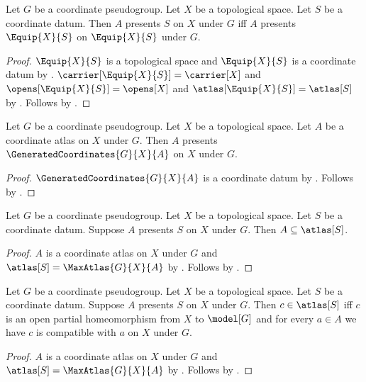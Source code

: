 \begin{theorem}\label{equip_presentation_iff}
    Let $G$ be a coordinate pseudogroup.
    Let $X$ be a topological space.
    Let $S$ be a coordinate datum.
    Then $A$ presents $S$ on $X$ under $G$ iff
        $A$ presents $\Equip{X}{S}$ on $\Equip{X}{S}$ under $G$.
\end{theorem}
\begin{proof}
    $\Equip{X}{S}$ is a topological space and $\Equip{X}{S}$ is a coordinate datum by
        .
    $\carrier[\Equip{X}{S}]=\carrier[X]$ and $\opens[\Equip{X}{S}]=\opens[X]$ and
        $\atlas[\Equip{X}{S}]=\atlas[S]$ by
        .
    Follows by .
\end{proof}

\begin{theorem}\label{generated_coordinates_presentation}
    Let $G$ be a coordinate pseudogroup.
    Let $X$ be a topological space.
    Let $A$ be a coordinate atlas on $X$ under $G$.
    Then $A$ presents $\GeneratedCoordinates{G}{X}{A}$ on $X$ under $G$.
\end{theorem}
\begin{proof}
    $\GeneratedCoordinates{G}{X}{A}$ is a coordinate datum by
        .
    Follows by .
\end{proof}

\begin{theorem}\label{presentation_chart_inclusion}
    Let $G$ be a coordinate pseudogroup.
    Let $X$ be a topological space.
    Let $S$ be a coordinate datum.
    Suppose $A$ presents $S$ on $X$ under $G$.
    Then $A\subseteq\atlas[S]$.
\end{theorem}
\begin{proof}
    $A$ is a coordinate atlas on $X$ under $G$ and
        $\atlas[S]=\MaxAtlas{G}{X}{A}$ by .
    Follows by .
\end{proof}

\begin{theorem}\label{presented_chart_iff}
    Let $G$ be a coordinate pseudogroup.
    Let $X$ be a topological space.
    Let $S$ be a coordinate datum.
    Suppose $A$ presents $S$ on $X$ under $G$.
    Then $c\in\atlas[S]$ iff
        $c$ is an open partial homeomorphism from $X$ to $\model[G]$ and
        for every $a\in A$ we have $c$ is compatible with $a$ on $X$ under $G$.
\end{theorem}
\begin{proof}
    $A$ is a coordinate atlas on $X$ under $G$ and
        $\atlas[S]=\MaxAtlas{G}{X}{A}$ by .
    Follows by .
\end{proof}

